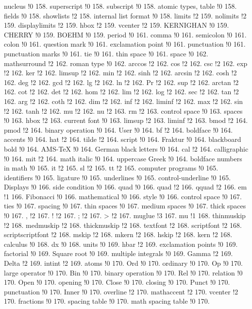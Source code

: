 nucleus !0 158.
superscript !0 158.
subscript !0 158.
atomic types, table !0 158.
fields !0 158.
showlists !2 158.
internal list format !0 158.
limits !2 159.
nolimits !2 159.
displaylimits !2 159.
hbox !2 159.
vcenter !2 159.
KERNIGHAN !0 159.
CHERRY !0 159.
BOEHM !0 159.
period !0 161.
comma !0 161.
semicolon !0 161.
colon !0 161.
question mark !0 161.
exclamation point !0 161.
punctuation !0 161.
punctuation marks !0 161.
tie !0 161.
thin space !0 161.
space !0 162.
mathsurround !2 162.
roman type !0 162.
arccos !2 162.
cos !2 162.
csc !2 162.
exp !2 162.
ker !2 162.
limsup !2 162.
min !2 162.
sinh !2 162.
arcsin !2 162.
cosh !2 162.
deg !2 162.
gcd !2 162.
lg !2 162.
ln !2 162.
Pr !2 162.
sup !2 162.
arctan !2 162.
cot !2 162.
det !2 162.
hom !2 162.
lim !2 162.
log !2 162.
sec !2 162.
tan !2 162.
arg !2 162.
coth !2 162.
dim !2 162.
inf !2 162.
liminf !2 162.
max !2 162.
sin !2 162.
tanh !2 162.
mu !2 162.
nu !2 163.
rm !2 163.
control space !0 163.
spaces !0 163.
hbox !2 163.
current font !0 163.
limsup !2 163.
liminf !2 163.
bmod !2 164.
pmod !2 164.
binary operation !0 164.
User !0 164.
bf !2 164.
boldface !0 164.
accents !0 164.
hat !2 164.
tilde !2 164.
script !0 164.
Fraktur !0 164.
blackboard bold !0 164.
AMS-TeX !0 164.
German black letters !0 164.
cal !2 164.
calligraphic !0 164.
mit !2 164.
math italic !0 164.
uppercase Greek !0 164.
boldface numbers in math !0 165.
it !2 165.
sl !2 165.
tt !2 165.
computer programs !0 165.
identifiers !0 165.
ligature !0 165.
underlines !0 165.
control-underline !0 165.
Displays !0 166.
side condition !0 166.
quad !0 166.
quad !2 166.
qquad !2 166.
em !1 166.
Fibonacci !0 166.
mathematical !0 166.
style !0 166.
control space !0 167.
ties !0 167.
spacing !0 167.
thin spaces !0 167.
medium spaces !0 167.
thick spaces !0 167.
, !2 167.
! !2 167.
; !2 167.
> !2 167.
muglue !3 167.
mu !1 168.
thinmuskip !2 168.
medmuskip !2 168.
thickmuskip !2 168.
textfont !2 168.
scriptfont !2 168.
scriptscriptfont !2 168.
mskip !2 168.
mkern !2 168.
hskip !2 168.
kern !2 168.
calculus !0 168.
dx !0 168.
units !0 169.
hbar !2 169.
exclamation points !0 169.
factorial !0 169.
Square root !0 169.
multiple integrals !0 169.
Gamma !2 169.
Delta !2 169.
intint !2 169.
atoms !0 170.
Ord !0 170.
ordinary !0 170.
Op !0 170.
large operator !0 170.
Bin !0 170.
binary operation !0 170.
Rel !0 170.
relation !0 170.
Open !0 170.
opening !0 170.
Close !0 170.
closing !0 170.
Punct !0 170.
punctuation !0 170.
Inner !0 170.
overline !2 170.
mathaccent !2 170.
vcenter !2 170.
fractions !0 170.
spacing table !0 170.
math spacing table !0 170.
